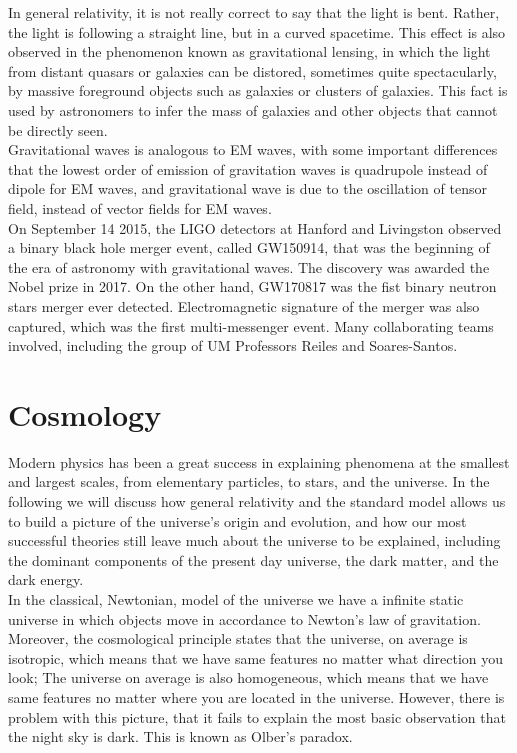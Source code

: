 \documentclass[11pt]{article}
\theoremstyle{break}
\theoremstyle{break}
\begin{document}
In general relativity, it is not really correct to say that the light is bent. Rather, the light is following a straight line, but in a curved spacetime. This effect is also observed in the phenomenon known as gravitational lensing, in which the light from distant quasars or galaxies can be distored, sometimes quite spectacularly, by massive foreground objects such as galaxies or clusters of galaxies. This fact is used by astronomers to infer the mass of galaxies and other objects that cannot be directly seen.\\

Gravitational waves is analogous to EM waves, with some important differences that the lowest order of emission of gravitation waves is quadrupole instead of dipole for EM waves, and gravitational wave is due to the oscillation of tensor field, instead of vector fields for EM waves. \\




On September 14 2015, the LIGO detectors at Hanford and Livingston observed a binary black hole merger event, called GW150914, that was the beginning of the era of astronomy with gravitational waves. The discovery was awarded the Nobel prize in 2017. On the other hand, GW170817 was the fist binary neutron stars merger ever detected. Electromagnetic signature of the merger was also captured, which was the first multi-messenger event. Many collaborating teams involved, including the group of UM Professors Reiles and  Soares-Santos.\\


\newpage
\section{Cosmology}
Modern physics has been a great success in explaining phenomena at the smallest and largest scales, from elementary particles, to stars, and the universe. In the following we will discuss how general relativity and the standard model allows us to build a picture of the universe's origin and evolution, and how our most successful theories still leave much about the universe to be explained, including the dominant components of the present day universe, the dark matter, and the dark energy.\\

In the classical, Newtonian, model of the universe we have a infinite static universe in which objects move in accordance to Newton's law of gravitation. Moreover, the cosmological principle states that the universe, on average is isotropic, which means that we have same features no matter what direction you look; The universe on average is also homogeneous, which means that we have same features no matter where you are located in the universe. However, there is problem with this picture, that it fails to explain the most basic observation that the night sky is dark. This is known as Olber's paradox.\\
\end{document}
